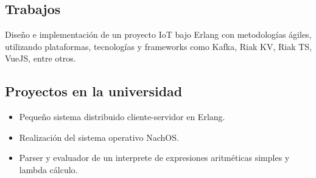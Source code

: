 \documentclass[10pt,a4paper]{moderncv}        %
\begin{document}
  \subsection{Trabajos}
  {Diseño e implementación de un proyecto IoT bajo Erlang con metodologías ágiles,\newline
  {utilizando plataformas, tecnologías y frameworks como Kafka, Riak KV, Riak TS, VueJS,
  entre otros.}
}
  \subsection{Proyectos en la universidad}
    \begin{itemize}
      \item Pequeño sistema distribuido cliente-servidor en Erlang.
      \item Realización del sistema operativo NachOS.
      \item Parser y evaluador de un interprete de expresiones aritméticas simples y lambda cálculo.
    \end{itemize}
\end{document}
